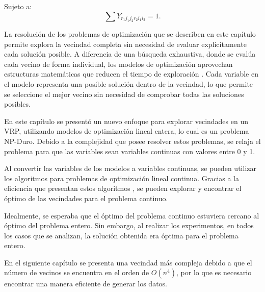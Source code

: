 \documentclass[12pt]{report}
\begin{document}
	Sujeto a:
	\[
	\sum  Y_{r_1j_1j_2r_2i_1i_2} = 1.
	\]

	La resolución de los problemas de optimización que se describen en este capítulo permite explora la vecindad completa sin necesidad de evaluar explícitamente cada solución posible. A diferencia de una búsqueda exhaustiva, donde se evalúa cada vecino de forma individual, los modelos de optimización aprovechan estructuras matemáticas que reducen el tiempo de exploración \cite{ref24}. Cada variable en el modelo representa una posible solución dentro de la vecindad, lo que permite se seleccione el mejor vecino sin necesidad de comprobar todas las soluciones posibles.

	En este capítulo se presentó un nuevo enfoque para explorar vecindades en un VRP, utilizando modelos de optimización lineal entera, lo cual es un problema NP-Duro. Debido a la complejidad que posee resolver estos problemas, se relaja el problema para que las variables sean variables continuas con valores entre 0 y 1.

	Al convertir las variables de los modelos a variables continuas, se pueden utilizar los algoritmos para problemas de optimización lineal continua. Gracias a la eficiencia que presentan estos algoritmos \cite{ref24}, se pueden explorar y encontrar el óptimo de las vecindades para el problema continuo.

	Idealmente, se esperaba que el óptimo del problema continuo estuviera cercano al óptimo del problema entero. Sin embargo, al realizar los experimentos, en todos los casos que se analizan, la solución obtenida era óptima para el problema entero.

	En el siguiente capítulo se presenta una vecindad más compleja debido a que el número de vecinos se encuentra en el orden de $O(n^4)$, por lo que es necesario encontrar una manera eficiente de generar los datos.



		\newpage
	
	
\end{document}
